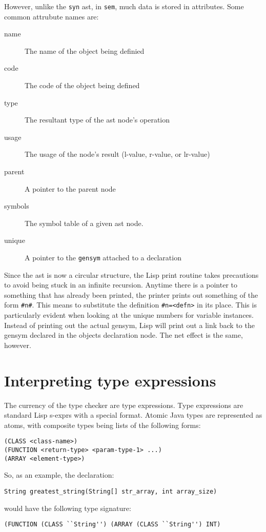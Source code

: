 \documentclass{article}[1994/05/24]
\begin{document}
However, unlike the \verb|syn| ast, in \verb|sem|, much data is stored
in attributes.  Some common attrubute names are:

\begin{description}

\item[name] The name of the object being definied

\item[code] The code of the object being defined

\item[type] The resultant type of the ast node's operation

\item[usage] The usage of the node's result (l-value, r-value, or lr-value)

\item[parent] A pointer to the parent node

\item[symbols] The symbol table of a given ast node.

\item[unique] A pointer to the \verb|gensym| attached to a declaration

\end{description}

Since the ast is now a circular structure, the Lisp print routine
takes precautions to avoid being stuck in an infinite recursion. 
Anytime there is a pointer to something that has already been printed,
the printer prints out something of the form \verb|#n#|.  This means
to substitute the definition \verb|#n=<defn>| in its place.  This is
particularly evident when looking at the unique numbers for variable
instances.  Instead of printing out the actual gensym, Lisp will print
out a link back to the gensym declared in the objects declaration node.
The net effect is the same, however.

\section{Interpreting type expressions}

The currency of the type checker are type expressions.  Type expressions
are standard Lisp s-exprs with a special format.  Atomic Java types
are represented as atoms, with composite types being lists of the 
following forms:

\begin{verbatim}
(CLASS <class-name>)
(FUNCTION <return-type> <param-type-1> ...)
(ARRAY <element-type>)
\end{verbatim}
So, as an example, the declaration:
\begin{verbatim}
String greatest_string(String[] str_array, int array_size)
\end{verbatim}
would have the following type signature:
\begin{verbatim}
(FUNCTION (CLASS ``String'') (ARRAY (CLASS ``String'') INT)
\end{verbatim}



\end{document}
